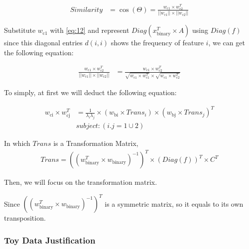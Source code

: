 \documentclass{sig-alternate}
\begin{document}
\begin{equation} \label{29} 
\begin{split}
Similarity & = \cos(\Theta) = \frac{w_{\text{c1}} \times w_{\text{c2}}^T} {||w_{\text{c1}}|| \times ||w_{\text{c2}}|| }
\end{split}
\end{equation}

Substitute \(w_{\text{c1}}\) with \ref{eq:12} and represent \(Diag(x_{\text{binary}}^T \times A)\) using \(Diag(f)\) since this diagonal entries \(d(i,i) \) shows the frequency of feature \(i\), we can get the following equation:


\begin{equation} \label{30} 
\begin{split}
\frac{w_{\text{c1}} \times w_{\text{c2}}^T} {||w_{\text{c1}}|| \times ||w_{\text{c2}}|| } & =  \frac{w_{\text{c1}} \times w_{\text{c2}}^T} {\sqrt{w_{\text{c1}} \times w_{\text{c1}}^T} \times \sqrt{w_{\text{c1}} \times w_{\text{c2}}^T} }
\end{split}
\end{equation}

To simply, at first we will deduct the following equation:

\begin{equation} \label{31} 
\begin{split}
w_{\text{ci}} \times w_{\text{cj}}^T & = \frac{1}{{\lambda}_{i}{\lambda}_{j} } \times (w_{\text{bi}} \times Trans_{i}) \times (w_{\text{bj}} \times Trans_{j})^T \\
& subject : (i.j = 1 \cup 2)
\end{split}
\end{equation}


In which \(Trans\) is a Transformation Matrix, 
\begin{equation} \label{31} 
\begin{split}
Trans = ((w_{\text{binary}}^T \times w_{\text{binary}})^{-1})^T \times (Diag(f))^T \times C^T  
\end{split}
\end{equation}

Then, we will focus on the transformation matrix. 

Since \(((w_{\text{binary}}^T \times w_{\text{binary}})^{-1})^T\) is a symmetric matrix, so it equals to its own transposition. 

\subsubsection{Toy Data Justification}
\end{document}
